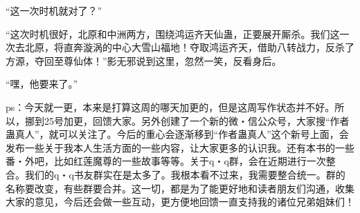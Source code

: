 \begin{this_body}
“这一次时机就对了？”

“这次时机很好，北原和中洲两方，围绕鸿运齐天仙蛊，正要展开厮杀。我们这一次去北原，将直奔漩涡的中心大雪山福地！夺取鸿运齐天，借助八转战力，反杀了方源，夺回至尊仙体！”影无邪说到这里，忽然一笑，反看身后。

“嘿，他要来了。”

ps：今天就一更，本来是打算这周的哪天加更的，但是这周写作状态并不好。所以，挪到25号加更，回馈大家。另外创建了一个新的微・信公众号，大家搜“作者蛊真人”，就可以关注了。今后的重心会逐渐移到“作者蛊真人”这个新号上面，会发布一些关于我本人生活方面的一些内容，让大家更多的认识我。还有本书的一些番・外吧，比如红莲魔尊的一些故事等等。关于q・q群，会在近期进行一次整合。我们的q・q书友群实在是太多了。我根本看不过来，我需要整合统一。群的名称要改变，有些群要合并。这一切，都是为了能更好地和读者朋友们沟通，收集大家的意见，今后还会做一些互动，更方便地回馈一直支持我的诸位兄弟姐妹们！

\end{this_body}

